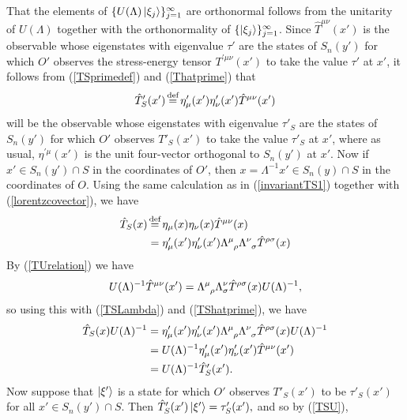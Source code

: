 That the elements of $\{U(\Lambda)\ket{\xi_j}\}_{j=1}^\infty$ are orthonormal follows from the unitarity of $U(\Lambda)$ together with the orthonormality of  $\{\ket{\xi_j}\}_{j=1}^\infty$.  Since $\hat{T}^{\mu\nu}(x')$ is the observable whose eigenstates with eigenvalue $\tau'$ are the states of $S_n(y')$ for which $O'$ observes the stress-energy tensor $T^{\prime\mu\nu}(x')$ to take the value $\tau'$ at $x'$, it follows from (\ref{TSprimedef}) and (\ref{Thatprime})  that 
\begin{equation}\label{TShatprime}
	\hat{T}'_S(x')\myeq\eta_\mu'(x')\eta_\nu'(x')\hat{T}^{\mu\nu}(x')
\end{equation}
 will be the observable whose eigenstates with eigenvalue $\tau'_S$ are the states of $S_n(y')$ for which $O'$ observes $T'_S(x')$ to take the value $\tau'_S$ at $x'$, where as usual, $\eta^{\prime\mu}(x')$ is the unit four-vector orthogonal to $S_n(y')$ at $x'$. Now if $x'\in S_n(y')\cap S$ in the coordinates of $O'$, then $x=\Lambda^{-1}x'\in S_n(y)\cap S$ in the coordinates of $O$. Using the same calculation as in (\ref{invariantTS1}) together with (\ref{lorentzcovector}), we have
\begin{equation}\label{TSLambda}
\begin{split}
\hat{T}_S(x)&\myeq\eta_\mu(x)\eta_\nu(x)\hat{T}^{\mu\nu}(x)\\
&=\eta_{\mu}'(x')\eta_{\nu}'(x') \Lambda\indices{^\mu_\rho}\Lambda\indices{^\nu_\sigma}\hat{T}^{\rho\sigma}(x)
\end{split}
\end{equation}
By (\ref{TUrelation}) we have
\begin{equation}
	U(\Lambda)^{-1}\hat{T}^{\mu\nu}(x')=\Lambda\indices{^\mu_\rho}\Lambda{^\nu_\sigma}\hat{T}^{\rho\sigma}(x)U(\Lambda)^{-1},
\end{equation}
so using this with (\ref{TSLambda}) and (\ref{TShatprime}), we have
\begin{equation}\label{TSU}
\begin{split}
\hat{T}_S(x)U(\Lambda)^{-1}&=\eta_{\mu}'(x')\eta_{\nu}'(x')\Lambda\indices{^\mu_\rho}\Lambda\indices{^\nu_\sigma}\hat{T}^{\rho\sigma}(x)U(\Lambda)^{-1}\\
&=U(\Lambda)^{-1} \eta_{\mu}'(x')\eta_{\nu}'(x')\hat{T}^{\mu\nu}(x')\\
&=U(\Lambda)^{-1} \hat{T}_S'(x').
\end{split}
\end{equation}
Now suppose that $\ket{\xi'}$ is a state for which $O'$ observes $T'_S(x')$ to be $\tau'_S(x')$ for all $x'\in S_n(y')\cap S$. Then $\hat{T}_S'(x')\ket{\xi'}=\tau_S'(x'),$ and so by (\ref{TSU}), 
